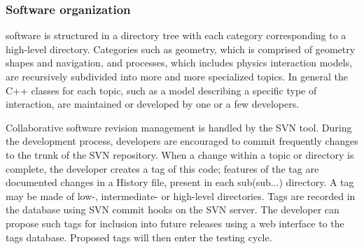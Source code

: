 
\subsubsection{Software organization}
\Gfour{} software is structured in a directory tree with each category 
corresponding to a high-level directory.  Categories such as geometry, which
is comprised of geometry shapes and navigation, and processes, which includes 
physics interaction models, are recursively subdivided into more and more 
specialized topics.  In general the C++ classes for each topic, such as a model
describing a specific type of interaction, are maintained or developed by one 
or a few developers. 

  Collaborative software revision management is handled by the SVN tool.  During
the development process, developers are encouraged to commit frequently changes 
to the trunk of the SVN repository.  When a change within a topic or directory 
is complete, the developer creates a tag of this code; features of the tag are 
documented changes in a History file, present in each sub(sub...) directory.  
A tag may be made of low-, intermediate- or high-level directories.   
Tags are recorded in the database using SVN commit hooks on the SVN server.  The
developer can propose such tags for inclusion into future releases using a web 
interface to the tags database.  Proposed tags will then enter the testing cycle. 
